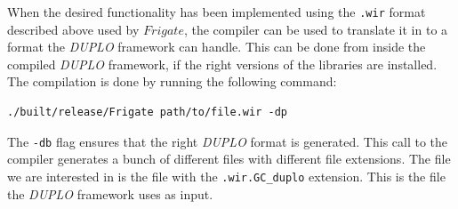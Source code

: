 \documentclass[twoside,11pt,openright]{report}
\newcommand{\DUPLO}{\textit{DUPLO} }
\begin{document}
\bigskip

When the desired functionality has been implemented using the \verb|.wir| format described above used by $Frigate$, the compiler can be used to translate it in to a format the \DUPLO framework can handle. This can be done from inside the compiled \DUPLO framework, if the right versions of the libraries are installed. The compilation is done by running the following command:

\begin{center}
\begin{verbatim}
./built/release/Frigate path/to/file.wir -dp
\end{verbatim}
\end{center}

The \verb|-db| flag ensures that the right \DUPLO format is generated. This call to the compiler generates a bunch of different files with different file extensions. The file we are interested in is the file with the \verb|.wir.GC_duplo| extension. This is the file the \DUPLO framework uses as input.

\bigskip
\end{document}
